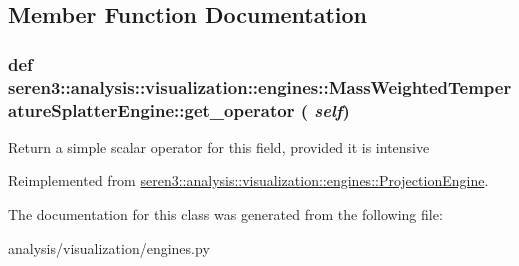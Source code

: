 \subsection{Member Function Documentation}
\hypertarget{classseren3_1_1analysis_1_1visualization_1_1engines_1_1MassWeightedTemperatureSplatterEngine_ab0bf32328b5d4a70303e76f866613e46}{
\subsubsection[{get\_\-operator}]{\setlength{\rightskip}{0pt plus 5cm}def seren3::analysis::visualization::engines::MassWeightedTemperatureSplatterEngine::get\_\-operator ( {\em self})}}
\label{classseren3_1_1analysis_1_1visualization_1_1engines_1_1MassWeightedTemperatureSplatterEngine_ab0bf32328b5d4a70303e76f866613e46}
\begin{DoxyVerb}
Return a simple scalar operator for this field, provided it is intensive
\end{DoxyVerb}
 

Reimplemented from \hyperlink{classseren3_1_1analysis_1_1visualization_1_1engines_1_1ProjectionEngine_a42f12a0ccc166799a59549d9fe672f2b}{seren3::analysis::visualization::engines::ProjectionEngine}.

The documentation for this class was generated from the following file:\begin{DoxyCompactItemize}
\item 
analysis/visualization/engines.py\end{DoxyCompactItemize}
